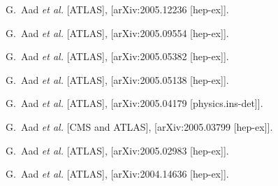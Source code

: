 

\begin{thebibliography}{9}
G.~Aad \textit{et al.} [ATLAS],
[arXiv:2005.12236 [hep-ex]].

G.~Aad \textit{et al.} [ATLAS],
[arXiv:2005.09554 [hep-ex]].

G.~Aad \textit{et al.} [ATLAS],
[arXiv:2005.05382 [hep-ex]].

G.~Aad \textit{et al.} [ATLAS],
[arXiv:2005.05138 [hep-ex]].

G.~Aad \textit{et al.} [ATLAS],
[arXiv:2005.04179 [physics.ins-det]].

G.~Aad \textit{et al.} [CMS and ATLAS],
[arXiv:2005.03799 [hep-ex]].

G.~Aad \textit{et al.} [ATLAS],
[arXiv:2005.02983 [hep-ex]].

G.~Aad \textit{et al.} [ATLAS],
[arXiv:2004.14636 [hep-ex]].


\end{thebibliography}

